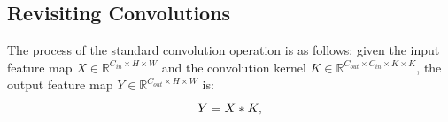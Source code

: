 \documentclass[a4paper,fleqn]{cas-dc}
\begin{document}








\subsection{Revisiting Convolutions}


The process of the standard convolution operation is as follows:
given the input feature map 
{\color{blue}$X\in\mathbb{R}^{C_{in}\times H\times W}$ and the convolution kernel $K\in\mathbb{R}^{C_{out}\times C_{in}\times K\times K}$},
the output feature map $Y\in\mathbb{R}^{C_{out}\times H\times W}$ is:
\begin{equation}
   \centering 
    Y = X * K ,
\end{equation}
\end{document}
